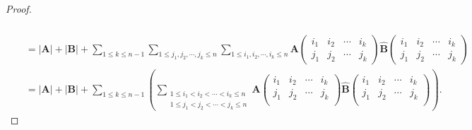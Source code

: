 \documentclass[../../main.tex]{subfiles}%
\begin{document}
\begin{proof}
\begin{align*}
{{\begin{array}{c}
\\
\end{array}}}
\\
&= |\boldsymbol{A}| + |\boldsymbol{B}| + \sum_{1\leqslant k\leqslant n - 1}\sum_{1\leqslant j_1,j_2,\cdots,j_k\leqslant n}\sum_{1\leqslant i_1,i_2,\cdots,i_k\leqslant n}\boldsymbol{A}\left(\begin{matrix}
i_1 & i_2 & \cdots & i_k\\
j_1 & j_2 & \cdots & j_k
\end{matrix}\right)\widehat{\boldsymbol{B}}\left(\begin{matrix}
i_1 & i_2 & \cdots & i_k\\
j_1 & j_2 & \cdots & j_k
\end{matrix}\right)
\\
&=|\boldsymbol{A}|+|\boldsymbol{B}|+\sum_{1\leqslant k\leqslant n-1}{\left( \sum_{\substack{1\leqslant i_1<i_2<\cdots <i_k\leqslant n\\1\leqslant j_1<j_2<\cdots <j_k\leqslant n}}{\boldsymbol{A}\left( \begin{matrix}
i_1&		i_2&		\cdots&		i_k\\
j_1&		j_2&		\cdots&		j_k\\
\end{matrix} \right) \widehat{\boldsymbol{B}}\left( \begin{matrix}
i_1&		i_2&		\cdots&		i_k\\
j_1&		j_2&		\cdots&		j_k\\
\end{matrix} \right)} \right)}.
\end{align*}
\end{proof}
\end{document}

